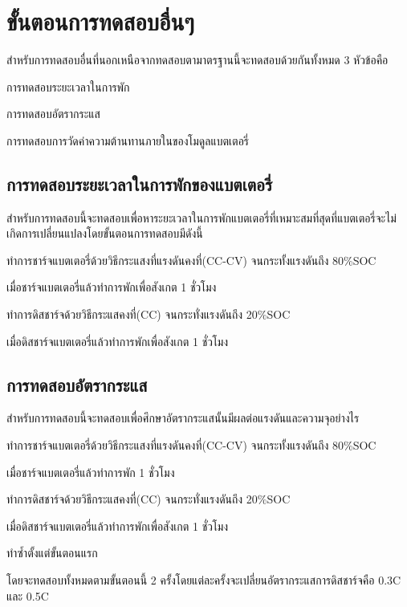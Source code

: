 \section{ขั้นตอนการทดสอบอื่นๆ}
สำหรับการทดสอบอื่นที่นอกเหนือจากทดสอบตามาตรฐานนี้จะทดสอบด้วยกันทั้งหมด 3 หัวข้อคือ
\begin{itemize}
{\item การทดสอบระยะเวลาในการพัก}
{\item การทดสอบอัตรากระแส}
{\item การทดสอบการวัดค่าความต้านทานภายในของโมดูลแบตเตอรี่}
\end{itemize}
\subsection{การทดสอบระยะเวลาในการพักของแบตเตอรี่}
สำหรับการทดสอบนี้จะทดสอบเพื่อหาระยะเวลาในการพักแบตเตอรี่ที่เหมาะสมที่สุดที่แบตเตอรี่จะไม่เกิดการเปลี่ยนแปลงโดยขั้นตอนการทดสอบมีดังนี้
\begin{enumerate}
{\item ทำการชาร์จแบตเตอรี่ด้วยวิธีกระแสงที่แรงดันคงที่(CC-CV) จนกระทั้งแรงดันถึง 80\%SOC}
{\item เมื่อชาร์จแบตเตอรี่แล้วทำการพักเพื่อสังเกต 1 ชั่วโมง}
{\item ทำการดิสชาร์จด้วยวิธีกระแสคงที่(CC) จนกระทั่งแรงดันถึง 20\%SOC}
{\item เมื่อดิสชาร์จแบตเตอรี่แล้วทำการพักเพื่อสังเกต 1 ชั่วโมง}
\end{enumerate}
\subsection{การทดสอบอัตรากระแส}
สำหรับการทดสอบนี้จะทดสอบเพื่อศึกษาอัตรากระแสนั้นมีผลต่อแรงดันและความจุอย่างไร
\begin{enumerate}
{\item ทำการชาร์จแบตเตอรี่ด้วยวิธีกระแสงที่แรงดันคงที่(CC-CV) จนกระทั้งแรงดันถึง 80\%SOC}
{\item เมื่อชาร์จแบตเตอรี่แล้วทำการพัก 1 ชั่วโมง}
{\item ทำการดิสชาร์จด้วยวิธีกระแสคงที่(CC) จนกระทั่งแรงดันถึง 20\%SOC}
{\item เมื่อดิสชาร์จแบตเตอรี่แล้วทำการพักเพื่อสังเกต 1 ชั่วโมง}
{\item ทำซ้ำตั้งแต่ขั้นตอนแรก}
\end{enumerate}
โดยจะทดสอบทั้งหมดตามขั้นตอนนี้ 2 ครั้งโดยแต่ละครั้งจะเปลี่ยนอัตรากระแสการดิสชาร์จคือ 0.3C และ 0.5C
